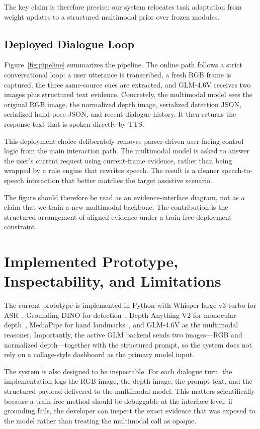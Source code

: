 \documentclass[10pt,twocolumn,letterpaper]{article}
\begin{document}
The key claim is therefore precise: our system relocates task adaptation from weight updates to a structured multimodal prior over frozen modules.

\subsection{Deployed Dialogue Loop}
Figure~\ref{fig:pipeline} summarizes the pipeline. The online path follows a strict conversational loop: a user utterance is transcribed, a fresh RGB frame is captured, the three same-source cues are extracted, and GLM-4.6V receives two images plus structured text evidence. Concretely, the multimodal model sees the original RGB image, the normalized depth image, serialized detection JSON, serialized hand-pose JSON, and recent dialogue history. It then returns the response text that is spoken directly by TTS.

This deployment choice deliberately removes parser-driven user-facing control logic from the main interaction path. The multimodal model is asked to answer the user's current request using current-frame evidence, rather than being wrapped by a rule engine that rewrites speech. The result is a cleaner speech-to-speech interaction that better matches the target assistive scenario.

The figure should therefore be read as an evidence-interface diagram, not as a claim that we train a new multimodal backbone. The contribution is the structured arrangement of aligned evidence under a train-free deployment constraint.

\section{Implemented Prototype, Inspectability, and Limitations}
The current prototype is implemented in Python with Whisper large-v3-turbo for ASR~\cite{radford2023whisper}, Grounding DINO for detection~\cite{liu2023groundingdino}, Depth Anything V2 for monocular depth~\cite{yang2024depthanythingv2}, MediaPipe for hand landmarks~\cite{lugaresi2019mediapipe}, and GLM-4.6V as the multimodal reasoner. Importantly, the active GLM backend sends two images---RGB and normalized depth---together with the structured prompt, so the system does not rely on a collage-style dashboard as the primary model input.

The system is also designed to be inspectable. For each dialogue turn, the implementation logs the RGB image, the depth image, the prompt text, and the structured payload delivered to the multimodal model. This matters scientifically because a train-free method should be debuggable at the interface level: if grounding fails, the developer can inspect the exact evidence that was exposed to the model rather than treating the multimodal call as opaque.
\end{document}
